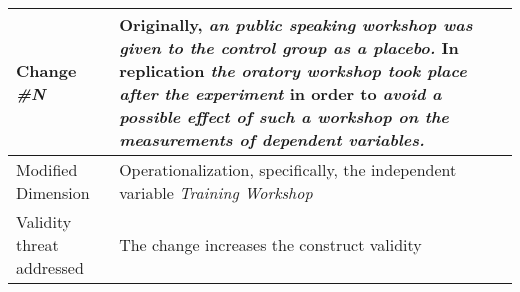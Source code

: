 \begin{table}
\begin{tabular}{| p{3.3cm} | p{9cm} |}
Change \textit{\#N}   & \parbox[t]{9cm} {Originally,  \textit{an public speaking workshop was given to the control group as a placebo.} } \parbox[t]{9cm}{In replication \textit{the oratory workshop took place after the experiment} } in order to  \textit{avoid a possible effect of such a workshop on the measurements of dependent variables.} \\  \hline
Modified Dimension & 
Operationalization, specifically, the independent variable \textit {Training Workshop }  \\  \hline 
Validity threat addressed  &  The change increases the construct validity   \\  \hline
\end{tabular}
\label{tab:plantilla-mind}
\end{table}



